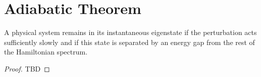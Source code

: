\section{Adiabatic Theorem}

\begin{theorem}
\label{addQAdiabatic}
A physical system remains in its instantaneous eigenstate if the perturbation acts sufficiently slowly and if this state is separated by an energy gap from the rest of the Hamiltonian spectrum.
\end{theorem}

\begin{proof}
  TBD
\end{proof}